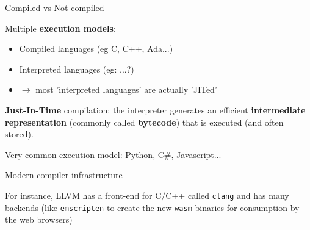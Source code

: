 \documentclass[compress]{beamer}
\begin{document}
\begin{frame}{Compiled vs Not compiled}

    Multiple \textbf{execution models}:

    \begin{itemize}
        \item<1-> Compiled languages (eg C, C++, Ada...)
        \item<2-> Interpreted languages (eg: ...?)
        \item<3-> $\rightarrow$ most 'interpreted languages' are actually 'JITed'
    \end{itemize}

     {

    \textbf{Just-In-Time} compilation: the interpreter generates an efficient
    \textbf{intermediate representation} (commonly called \textbf{bytecode})
    that is executed (and often stored).

    Very common execution model: Python, C\#, Javascript...

    }
\end{frame}

\begin{frame}{Modern compiler infrastructure}
    \begin{center}
    \end{center}

    For instance, LLVM has a front-end for C/C++ called \texttt{clang} and has
    many backends (like \texttt{emscripten} to create the new \texttt{wasm}
    binaries for consumption by the web browsers)
\end{frame}
\end{document}
